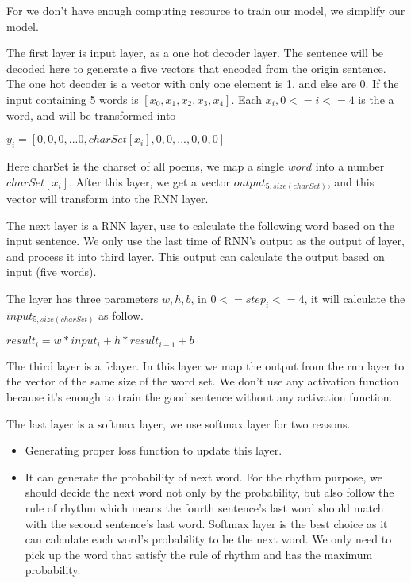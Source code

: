 \documentclass[10pt,twocolumn,letterpaper]{article}
\begin{document}
For we don’t have enough computing resource to train our model, we simplify our model.

The first layer is input layer, as a one hot decoder layer. The sentence will be decoded here to generate a five vectors that encoded from the origin sentence. The one hot decoder is a vector with only one element is 1, and else are 0. If the input containing 5 words is $[x_{0}, x_{1}, x_{2}, x_{3}, x_{4}]$. Each $x_{i}, 0 <= i <= 4$ is the a word, and will be transformed into 
\begin{center}
$y_{i} = [0, 0, 0, ... 0, charSet[x_{i}], 0, 0, ... , 0, 0, 0]$
\end{center}

Here charSet is the charset of all poems, we map a single $word$ into a number $charSet[x_{i}]$.
After this layer, we get a vector $output_{5, size(charSet)}$, and this vector will transform into the RNN layer.

The next layer is a RNN layer, use to calculate the following word based on the input sentence. We only use the last time of RNN’s output as the output of layer, and process it into third layer. This output can calculate the output based on input (five words).

The layer has three parameters $w, h, b$, in $0 <= step_{i} <= 4$, it will calculate the $input_{5, size(charSet)}$ as follow.
\begin{center}
    $result_{i} = w * input_{i} + h * result_{i - 1} + b$
\end{center}

The third layer is a fclayer. In this layer we map the output from the rnn layer to the vector of the same size of the word set. We don’t use any activation function because it’s enough to train the good sentence without any activation function.

The last layer is a softmax layer, we use softmax layer for two reasons.

\begin{itemize}
\item Generating proper loss function to update this layer.
\item It can generate the probability of next word. For the rhythm purpose, we should decide the next word not only by the probability, but also follow the rule of rhythm which means the fourth sentence’s last word should match with the second sentence’s last word. Softmax layer is the best choice as it can calculate each word’s probability to be the next word. We only need to pick up the word that satisfy the rule of rhythm and has the maximum probability. 
\end{itemize}
\end{document}
